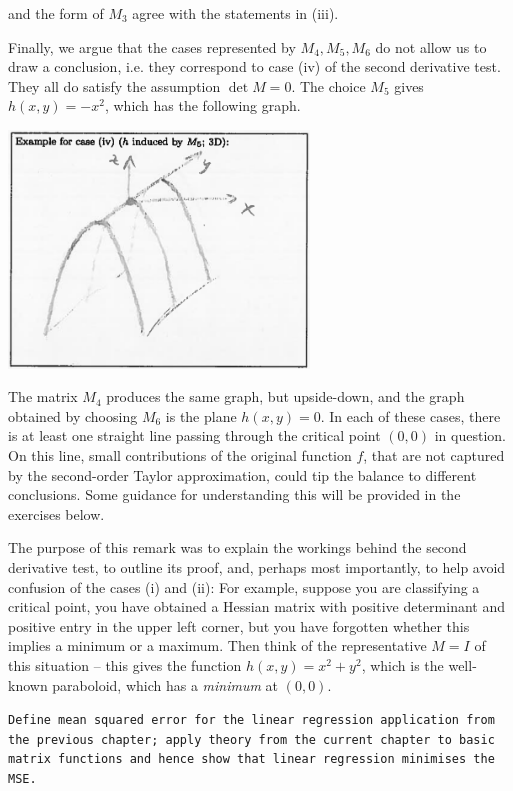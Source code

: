 \begin{remark}
\begin{center}
\end{center}
and the form of $M_3$ agree with the statements in (iii).

Finally, we argue that the cases represented by $M_4,M_5,M_6$ do not allow us to draw a conclusion, i.e. they correspond to case (iv) of the second derivative test. They all do satisfy the assumption $\det M = 0$. The choice $M_5$ gives $h(x,y)=-x^2$, which has the following graph.
\begin{center}
	\includegraphics[width=0.6\textwidth]{./Figures/f310.png}
\end{center}
The matrix $M_4$ produces the same graph, but upside-down, and the graph obtained by choosing $M_6$ is the plane $h(x,y)=0$. In each of these cases, there is at least one straight line passing through the critical point $(0,0)$ in question. On this line, small contributions of the original function $f$, that are not captured by the second-order Taylor approximation, could tip the balance to different conclusions. Some guidance for understanding this will be provided in the exercises below.

The purpose of this remark was to explain the workings behind the second derivative test, to outline its proof, and, perhaps most importantly, to help avoid confusion of the cases (i) and (ii): For example, suppose you are classifying a critical point, you have obtained a Hessian matrix with positive determinant and positive entry in the upper left corner, but you have forgotten whether this implies a minimum or a maximum. Then think of the representative $M = I$ of this situation -- this gives the function $h(x,y) = x^2 + y^2$, which is the well-known paraboloid, which has a \emph{minimum} at $(0,0)$.
\end{remark}

\begin{application}
\texttt{Define mean squared error for the linear regression application from the previous chapter; apply theory from the current chapter to basic matrix functions and hence show that linear regression minimises the MSE.}
\end{application}

